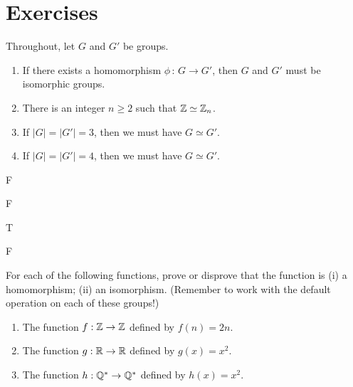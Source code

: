 \pagebreak
\section{Exercises}


\begin{exercise}[ID=3A]
\tf Throughout, let $G$ and $G'$ be  groups.

\begin{enumerate}
\item If there exists a homomorphism $\phi\,:\,G\to G'$, then $G$ and $G'$ must be isomorphic groups.

\item There is an integer $n\geq 2$ such that $\mathbb{Z}\simeq \mathbb{Z}_n$.

\item If $|G|=|G'|=3$, then we must have $G\simeq G'$.

\item If $|G|=|G'|=4$, then we must have $G\simeq G'$.
\end{enumerate}
\end{exercise}


\begin{solution}[print=true]
\begin{inparaenum}[(a)]
\item F \hfill \item F \hfill \item  T \hfill \item F
\end{inparaenum}
\end{solution}

\begin{exercise}For each of the following functions, prove or
    disprove that the function is (i) a homomorphism; (ii)
    an isomorphism. (Remember to work with the default operation on each of these groups!)
\begin{enumerate}
\item The function $f:\mathbb{Z}\to\mathbb{Z}$ defined by $f(n)=2n$.
\item The function $g:\mathbb{R}\to\mathbb{R}$ defined by $g(x)=x^2$.
\item The function $h:\mathbb{Q}^*\to\mathbb{Q}^*$ defined by
    $h(x)=x^2$.
\end{enumerate}

\end{exercise}

